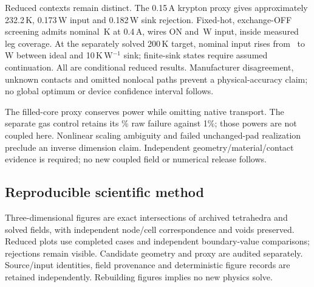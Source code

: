 \documentclass[11pt,a4paper]{article}
\begin{document}
Reduced contexts remain distinct. The 0.15\,A krypton proxy gives approximately 232.2\,K, 0.173\,W input and 0.182\,W sink rejection. Fixed-hot, exchange-OFF screening admits nominal \ScreenDie\,K at 0.4\,A, wires ON and \ScreenPower\,W input, inside measured leg coverage. At the separately solved 200\,K target, nominal input rises from \SinkIdealPower\ to \SinkFinalPower\,W between ideal and 10\,K\,W$^{-1}$ sink; finite-sink states require assumed continuation. All are conditional reduced results. Manufacturer disagreement, unknown contacts and omitted nonlocal paths prevent a physical-accuracy claim; no global optimum or device confidence interval follows.

The filled-core proxy conserves power while omitting native transport. The separate gas control retains its \GasRawMismatch\% raw failure against 1\%; those powers are not coupled here. Nonlinear scaling ambiguity and failed unchanged-pad realization preclude an inverse dimension claim. Independent geometry/material/contact evidence is required; no new coupled field or numerical release follows.

\subsection{Reproducible scientific method}
Three-dimensional figures are exact intersections of archived tetrahedra and solved fields, with independent node/cell correspondence and voids preserved. Reduced plots use completed cases and independent boundary-value comparisons; rejections remain visible. Candidate geometry and proxy are audited separately. Source/input identities, field provenance and deterministic figure records are retained independently. Rebuilding figures implies no new physics solve.
\end{document}
